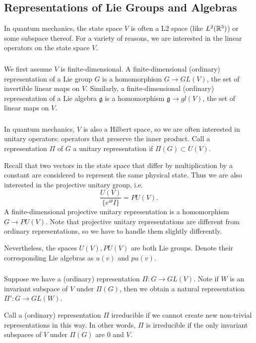 \subsection{Representations of Lie Groups and Algebras}
In quantum mechanics, the state space $V$ is often a L2 space (like $L^2({\mathbb R}^3)$) or some subspace thereof. For a variety of reasons, we are interested in the linear operators on the state space $V$.

\subsubsection{}
We first assume $V$ is finite-dimensional. A finite-dimensional (ordinary) representation of a Lie group $G$ is a homomorphism $G \rightarrow GL(V)$, the set of invertible linear maps on $V$. Similarly, a finite-dimensional (ordinary) representation of a Lie algebra $\mathfrak g$ is a homomorphism $\mathfrak g \rightarrow gl(V)$, the set of linear maps on $V$.

\subsubsection{}
In quantum mechanics, $V$ is also a Hilbert space, so we are often interested in unitary operators: operators that preserve the inner product. Call a representation $\Pi$ of $G$ a unitary representation if $\Pi(G) \subset U(V)$.

Recall that two vectors in the state space that differ by multiplication by a constant are considered to represent the same physical state. Thus we are also interested in the projective unitary group, i.e.
\[
    \frac{U(V)}{\{e^{i\theta}I\}} = PU(V).
\]
A finite-dimensional projective unitary representation is a homomorphism $G \rightarrow PU(V)$. Note that projective unitary representations are different from ordinary representations, so we have to handle them slightly differently.

Nevertheless, the spaces $U(V), PU(V)$ are both Lie groups. Denote their corresponding Lie algebras as $u(v)$ and $pu(v)$.

\subsubsection{}
Suppose we have a (ordinary) representation $\Pi: G \rightarrow GL(V)$. Note if $W$ is an invariant subspace of $V$ under $\Pi(G)$, then we obtain a natural representation $\Pi': G \rightarrow GL(W)$.

Call a (ordinary) representation $\Pi$ irreducible if we cannot create new non-trivial representations in this way. In other words, $\Pi$ is irreducible if the only invariant subspaces of $V$ under $\Pi(G)$ are 0 and $V$.

